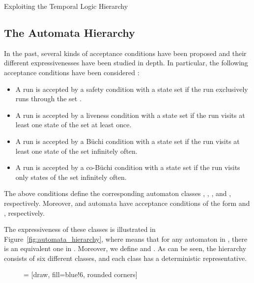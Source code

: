 \documentclass[copyright,creativecommons]{eptcs}
\begin{document}
\begin{section}{Exploiting the Temporal Logic Hierarchy}
\label{TemporalLogicHierarchySec}

\subsection{The Automata Hierarchy}
\label{AutomataHierarchySec}
In the past, several kinds of acceptance conditions have been proposed and their different expressivenesses have been studied in depth. In particular, the following acceptance conditions have been considered \cite{Wagn79,Thom90a,Schn03}:

\begin{itemize}
\item A run is accepted by a safety condition  with a state
set  if the run exclusively runs through the set .
\item A run is accepted by a liveness condition  with
a state set  if the run visits at least one state of the set  at least once.
\item A run is accepted by a Büchi condition  with
a state set  if the run visits at least one state of the set 
infinitely often.
\item A run is accepted by a co-Büchi condition 
with a state set  if the run visits only states of the set 
infinitely often.
\end{itemize}

\noindent The above conditions define the corresponding automaton classes , , , and , respectively. Moreover,  and  automata have acceptance conditions of the form  and , respectively.

The expressiveness of these classes is illustrated in Figure~\ref{fig:automata_hierarchy}, where  means that for any automaton in , there is an equivalent one in . Moreover, we define  and . As can be seen, the hierarchy consists of six different classes, and each class has a deterministic representative.

\begin{figure}
 = [draw, fill=blue!6, rounded corners]
\end{figure}
\end{section}
\end{document}
